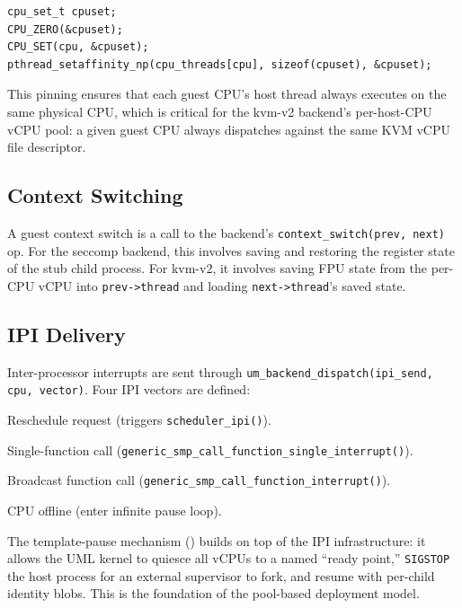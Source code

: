 \begin{lstlisting}[language=KernelC, caption={CPU affinity pinning for vCPU
  threads (from \texttt{arch/um/os-Linux/smp.c}).}, label={lst:affinity}]
cpu_set_t cpuset;
CPU_ZERO(&cpuset);
CPU_SET(cpu, &cpuset);
pthread_setaffinity_np(cpu_threads[cpu], sizeof(cpuset), &cpuset);
\end{lstlisting}

This pinning ensures that each guest CPU's host thread always executes on the
same physical CPU, which is critical for the kvm-v2 backend's per-host-CPU
vCPU pool: a given guest CPU always dispatches against the same KVM vCPU file
descriptor.

\subsection{Context Switching}

A guest context switch is a call to the backend's \texttt{context\_switch(prev,
next)} op.  For the seccomp backend, this involves saving and restoring the
register state of the stub child process.  For kvm-v2, it involves saving
FPU state from the per-CPU vCPU into \texttt{prev->thread} and loading
\texttt{next->thread}'s saved state.

\subsection{IPI Delivery}

Inter-processor interrupts are sent through \texttt{um\_backend\_dispatch(ipi\_send, cpu, vector)}.  Four IPI vectors are defined:

\begin{description}[leftmargin=2em, font=\ttfamily, itemsep=2pt]
\item[UML\_IPI\_RES] Reschedule request (triggers \texttt{scheduler\_ipi()}).
\item[UML\_IPI\_CALL\_SINGLE] Single-function call
  (\texttt{generic\_smp\_call\_function\_single\_interrupt()}).
\item[UML\_IPI\_CALL] Broadcast function call
  (\texttt{generic\_smp\_call\_function\_interrupt()}).
\item[UML\_IPI\_STOP] CPU offline (enter infinite pause loop).
\end{description}

The template-pause mechanism ()
builds on top of the IPI infrastructure: it allows the UML kernel to quiesce
all vCPUs to a named ``ready point,'' \texttt{SIGSTOP} the host process for
an external supervisor to fork, and resume with per-child identity blobs.
This is the foundation of the pool-based deployment model.

